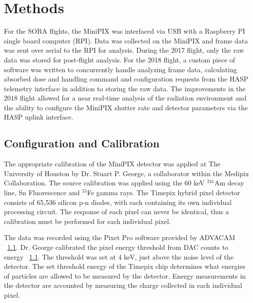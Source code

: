 \section{Methods}
\label{Methods}
For the SORA flights, the MiniPIX was interfaced via USB with a Raspberry PI single board computer (RPI). Data was collected on the MiniPIX and frame data was sent over serial to the RPI for analysis. During the 2017 flight, only the raw data was stored for post-flight analysis. For the 2018 flight, a custom piece of software was written to concurrently handle analyzing frame data, calculating absorbed dose and handling command and configuration requests from the HASP telemetry interface in addition to storing the raw data. The improvements in the 2018 flight allowed for a near real-time analysis of the radiation environment and the ability to configure the MiniPIX shutter rate and detector parameters via the HASP uplink interface.


\subsection{Configuration and Calibration}
The appropriate calibration of the MiniPIX detector was applied at The University of Houston by Dr. Stuart P. George, a collaborator within the Medipix Collaboration. The source calibration was applied using the 60 keV $^{241}$Am decay line, Sn Fluorescence and $^{55}$Fe gamma rays. The Timepix hybrid pixel detector
consists of 65,536 silicon p-n diodes, with each containing its own individual processing circuit. The response
of each pixel can never be identical, thus a calibration must be performed for each individual pixel. 

The data was recorded using the Pixet Pro software provided by ADVACAM ~\ref{}. Dr. George calibrated
the pixel energy threshold from DAC counts to energy ~\ref{}. The threshold was set at 4 keV, just above
the noise level of the detector. The set threshold energy of the Timepix chip determines what energies of
particles are allowed to be measured by the detector. Energy measurements in the detector are accounted
by measuring the charge collected in each individual pixel.

